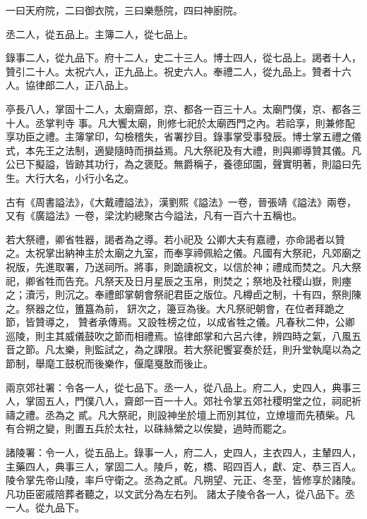 \begin{pinyinscope}
 一曰天府院，二曰御衣院，三曰樂懸院，四曰神廚院。



 丞二人，從五品上。主簿二人，從七品上。



 錄事二人，從九品下。府十二人，史二十三人。博士四人，從七品上。謁者十人，贊引二十人。太祝六人，正九品上。祝史六人。奉禮二人，從九品上。贊者十六人。協律郎二人，正八品上。



 亭長八人，掌固十二人，太廟齋郎，京、都各一百三十人。太廟門僕，京、都各三十人。丞掌判寺
 事。凡大饗太廟，則修七祀於太廟西門之內。若祫享，則兼修配享功臣之禮。主簿掌印，勾檢稽失，省署抄目。錄事掌受事發辰。博士掌五禮之儀式，本先王之法制，適變隨時而損益焉。凡大祭祀及有大禮，則與卿導贊其儀。凡公已下擬謚，皆跡其功行，為之褒貶。無爵稱子，養德邱園，聲實明著，則謚曰先生。大行大名，小行小名之。



 古有《周書謚法》，《大戴禮謚法》，漢劉熙《謚法》一卷，晉張靖《謚法》兩卷，又有《廣謚法》一卷，梁沈約總聚古今謚法，凡有一百六十五稱也。



 若大祭禮，卿省牲器，謁者為之導。若小祀及
 公卿大夫有嘉禮，亦命謁者以贊之。太祝掌出納神主於太廟之九室，而奉享禘佩給之儀。凡國有大祭祀，凡郊廟之祝版，先進取署，乃送祠所。將事，則跪讀祝文，以信於神；禮成而焚之。凡大祭祀，卿省牲而告充。凡祭天及日月星辰之玉帛，則焚之；祭地及社稷山嶽，則瘞之；瀆污，則沉之。奉禮郎掌朝會祭祀君臣之版位。凡樽卣之制，十有四，祭則陳之。祭器之位，簠簋為前，鈃次之，籩豆為後。大凡祭祀朝會，在位者拜跪之節，皆贊導之，
 贊者承傳焉。又設牲榜之位，以成省牲之儀。凡春秋二仲，公卿巡陵，則主其威儀鼓吹之節而相禮焉。協律郎掌和六呂六律，辨四時之氣，八風五音之節。凡太樂，則監試之，為之課限。若大祭祀饗宴奏於廷，則升堂執麾以為之節制，舉麾工鼓柷而後樂作，偃麾戛敔而後止。



 兩京郊社署：令各一人，從七品下。丞一人，從八品上。府二人，史四人，典事三人，掌固五人，門僕八人，齋郎一百一十人。郊社令掌五郊社稷明堂之位，祠祀祈禱之禮。丞為之
 貳。凡大祭祀，則設神坐於壇上而別其位，立燎壇而先積柴。凡有合朔之變，則置五兵於太社，以硃絲縈之以俟變，過時而罷之。



 諸陵署：令一人，從五品上。錄事一人，府二人，史四人，主衣四人，主輦四人，主藥四人，典事三人，掌固二人。陵戶，乾，橋、昭四百人，獻、定、恭三百人。陵令掌先帝山陵，率戶守衛之。丞為之貳。凡朔望、元正、冬至，皆修享於諸陵。凡功臣密戚陪葬者聽之，以文武分為左右列。
 諸太子陵令各一人，從八品下。丞一人。從九品下。




\end{pinyinscope}

